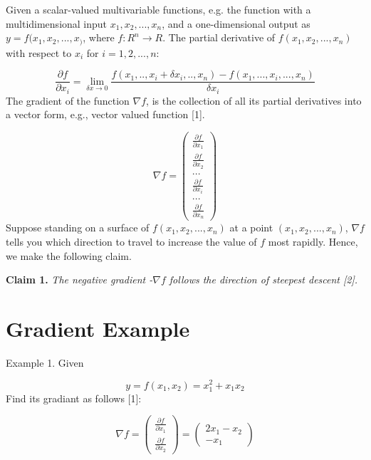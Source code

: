 \documentclass[conference]{IEEEtran}
\begin{document}
Given a scalar-valued multivariable functions,
e.g. the function with a multidimensional input
$x_1, x_2, ..., x_n$, and 
a one-dimensional output as 
$y=f(x_1, x_2, ..., x_)$, where 
$f : R^n \to R$. The partial 
derivative of $f(x_1, x_2, ..., x_n)$ with respect
to $x_i$ for $i=1,2,...,n$: 

\begin{equation}
\frac{ \partial f } { \partial x_i } = 
\lim_{\delta x\to 0} 
\frac{ f(x_1,.., x_i + \delta x_i, .., x_n) 
- f(x_1,..., x_i, ..., x_n)} 
{ \delta x_i }
\end{equation}
The gradient of the function $\nabla f$,
is the collection of all its partial derivatives into 
a vector form, e.g., vector valued function [1]. 

\begin{equation}
\nabla f =  
\left(\begin{array}{c} 
\frac{ \partial f} { \partial x_1 } \\ 
\frac{ \partial f} { \partial x_2 } \\
... \\
\frac{ \partial f} { \partial x_i } \\
... \\
\frac{ \partial f} { \partial x_n } 
\end{array}\right)
\end{equation}
Suppose standing on a surface of 
$f(x_1, x_2, ..., x_n)$ at a point 
$(x_1, x_2, ..., x_n)$, 
$\nabla f$ tells you which direction to 
travel to increase the value of $f$ most rapidly.
Hence, we make the following claim. 

\textbf{Claim 1.} 
\textit{The negative gradient -$\nabla f$ follows
the direction of steepest descent [2].}

\section{Gradient Example}

Example 1. Given 

\begin{equation}
y = f(x_1,x_2) = x_1^2 + x_1 x_2  
\end{equation}
Find its gradiant as follows [1]: 

\begin{equation}
\nabla f =  
\left(\begin{array}{c} 
\frac{ \partial f} { \partial x_1 } \\ 
\frac{ \partial f} { \partial x_2 } 
\end{array}\right)
= 
\left(\begin{array}{c} 
2 x_1 - x_2  \\ 
 - x_1 
\end{array}\right)
\end{equation}
\end{document}
